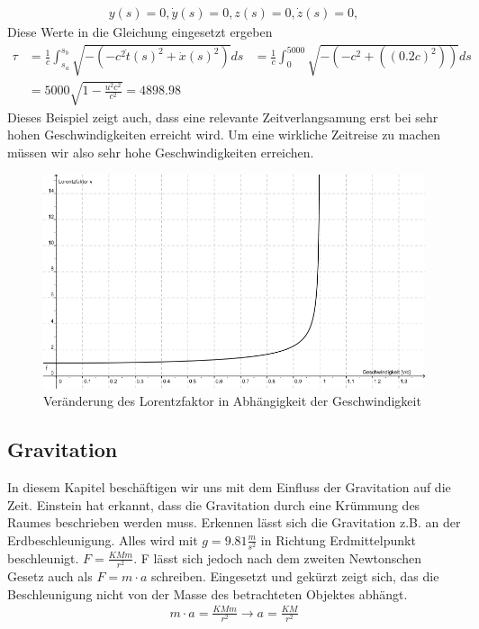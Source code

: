 \begin{refsection}
\begin{align*}
    y(s)=0, \dot{y}(s)=0,
    z(s)=0, \dot{z}(s)=0,
\end{align*}
Diese Werte in die Gleichung eingesetzt ergeben
\begin{align*}
    \tau
    &=
    \frac{1}{c}\int_{s_{a}}^{s_{b}}\sqrt{-(-c^2\dot{t}(s)^2+\dot{x}(s)^2)}ds
    &=
    \frac{1}{c}\int_{0}^{5000}\sqrt{-(-c^2+((0.2c)^2))}ds\\
    &=
    5000\sqrt{1-\frac{u^2 c^2}{c^2}} = 4898.98
\end{align*}
Dieses Beispiel zeigt auch, dass eine relevante Zeitverlangsamung erst bei sehr hohen Geschwindigkeiten erreicht wird. Um eine wirkliche Zeitreise zu machen müssen wir also sehr hohe Geschwindigkeiten erreichen.
\begin{figure}[H]
    \centering
    \includegraphics[width=\hsize]{zeitreisen/Lorentzfaktor.jpg}
    \caption{Ver\"anderung des Lorentzfaktor in Abh\"angigkeit der Geschwindigkeit%
        \label{skript:geodaten:fig:transport}}
\end{figure}
\subsection{Gravitation}

	In diesem Kapitel beschäftigen wir uns mit dem Einfluss der Gravitation auf die Zeit. Einstein hat erkannt, dass die Gravitation durch eine Krümmung des Raumes beschrieben werden muss. Erkennen lässt sich die Gravitation z.B. an der Erdbeschleunigung. Alles wird mit $g=9.81\frac{m}{s^2}$ in Richtung Erdmittelpunkt beschleunigt. $F=\frac{KMm}{r^2}$. F lässt sich jedoch nach dem zweiten Newtonschen Gesetz auch als $F=m\cdot a$ schreiben. Eingesetzt und gekürzt zeigt sich, das die Beschleunigung nicht von der Masse des betrachteten Objektes abhängt.
	\begin{align*}
		m\cdot a = \frac{KMm}{r^2} \rightarrow a=\frac{KM}{r^2} 
	\end{align*}
	

\end{refsection}
